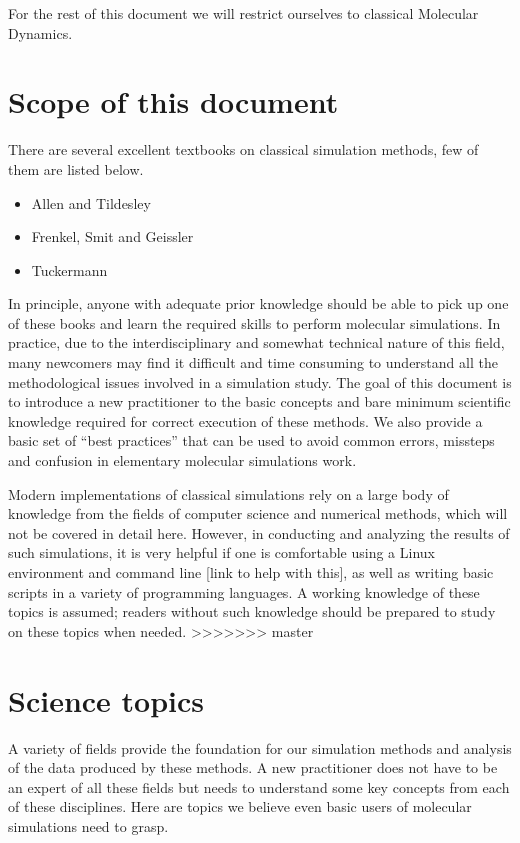 \documentclass[9pt,bestpractices]{livecoms}
\begin{document}
For the rest of this document we will restrict ourselves to classical Molecular
Dynamics.

\section{Scope of this document}
There are several excellent textbooks on classical simulation methods, few of
them are listed below.

\begin{itemize}
\item Allen and Tildesley
\item Frenkel, Smit and Geissler
\item Tuckermann
\end{itemize}

In principle, anyone with adequate prior knowledge should be able to pick up one
of these books and learn the required skills to perform molecular simulations.
In practice, due to the interdisciplinary and somewhat technical nature of this
field, many newcomers may find it difficult and time consuming to understand all
the methodological issues involved in a simulation study.   The goal of this
document is to introduce a new practitioner to the basic concepts and bare
minimum scientific knowledge required for correct execution of these methods. We
also provide a basic set of “best practices” that can be used to avoid common
errors, missteps and confusion in elementary molecular simulations work.

Modern implementations of classical simulations rely on a large body of
knowledge from the fields of computer science and numerical methods, which will
not be covered in detail here. However, in conducting and analyzing the results
of such simulations, it is very helpful if one is comfortable using a Linux
environment and command line [link to help with this], as well as writing basic
scripts in a variety of programming languages. A working knowledge of these
topics is assumed; readers without such knowledge should be prepared to study on
these topics when needed.
>>>>>>> master



\section{Science topics}
A variety of fields provide the foundation for our simulation methods and
analysis of the data produced by these methods. A new practitioner does not have
to be an expert of all these fields but needs to understand some key concepts
from each of these disciplines. Here are topics we believe even basic users of
molecular simulations need to grasp.
\end{document}
